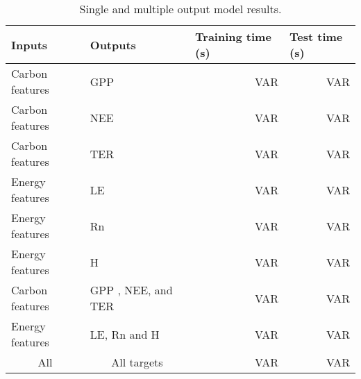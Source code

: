 \begin{table}[htbp]
\caption{Single and multiple output model results.}
\begin{center}
  \begin{tabular}{|l|l|r|r|}
    \hline
    Inputs & Outputs & \multicolumn{1}{l|}{Training time (s)} & \multicolumn{1}{l|}{Test time (s)}  \\ \hline
    Carbon features & GPP & VAR & VAR  \\ \hline
    Carbon features & NEE & VAR & VAR  \\ \hline
    Carbon features & TER & VAR & VAR  \\ \hline
    Energy features & LE & VAR & VAR  \\ \hline
    Energy features & Rn & VAR & VAR  \\ \hline
    Energy features & H   & VAR & VAR  \\ \hline
    \multicolumn{ 1}{|l|}{Carbon features} & \multicolumn{ 1}{l|}{GPP , NEE, and TER} & VAR & VAR  \\ \cline{ 3- 6}
    \multicolumn{ 1}{|l|}{Energy features} & \multicolumn{ 1}{l|}{LE, Rn and H}  & VAR & VAR  \\ \cline{ 3- 6}
    \multicolumn{ 1}{|c|}{All} & \multicolumn{ 1}{c|}{All targets} & VAR & VAR  \\ \cline{ 3- 6}
\end{tabular}
\end{center}
\label{results}
\end{table}
